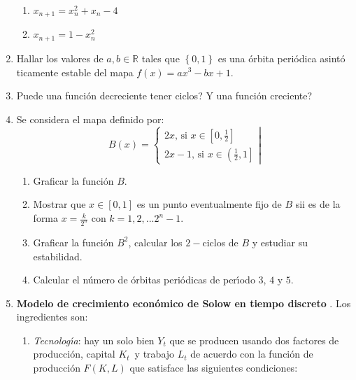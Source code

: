 \documentclass{article}
\begin{document}
\begin{enumerate}
\begin{enumerate}
\item $x_{n+1}=x_{n}^{2}+x_{n}-4$

\item $x_{n+1}=1-x_{n}^{2}$
\end{enumerate}

\item Hallar los valores de $a,b\in 
\mathbb{R}
$ tales que $\left\{ 0,1\right\} $ es una \'{o}rbita peri\'{o}dica asint\'{o}%
ticamente estable del mapa $f(x)=ax^{3}-bx+1.$

\item Puede una funci\'{o}n decreciente tener ciclos? Y una funci\'{o}n
creciente?

\item Se considera el mapa definido por:%
\begin{equation*}
B(x)=\left\{ 
\begin{array}{c}
2x\text{, si }x\in \left[ 0,\frac{1}{2}\right] \\ 
2x-1\text{, si }x\in \left( \frac{1}{2},1\right]%
\end{array}%
\right\vert
\end{equation*}

\begin{enumerate}
\item Graficar la funci\'{o}n $B$.

\item Mostrar que $x\in \left[ 0,1\right] $ es un punto eventualmente fijo
de $B$ sii es de la forma $x=\frac{k}{2^{n}}$ con $k=1,2,...2^{n}-1$.

\item Graficar la funci\'{o}n $B^{2}$, calcular los $2-$ciclos de $B$ y
estudiar su estabilidad.

\item Calcular el n\'{u}mero de \'{o}rbitas peri\'{o}dicas de per\'{\i}odo $%
3 $, $4$ y $5$.
\end{enumerate}

\item \textbf{Modelo de crecimiento econ\'{o}mico de Solow en tiempo discreto%
}. Los ingredientes son:

\begin{enumerate}
\item \textit{Tecnolog\'{\i}a}: hay un solo bien $Y_{t}$ que se producen
usando dos factores de producci\'{o}n, capital $K_{t}$\ y trabajo $L_{t}$ de
acuerdo con la funci\'{o}n de producci\'{o}n $F\left( K,L\right) $ que
satisface las siguientes condiciones:


\end{enumerate}
\end{enumerate}
\end{document}
